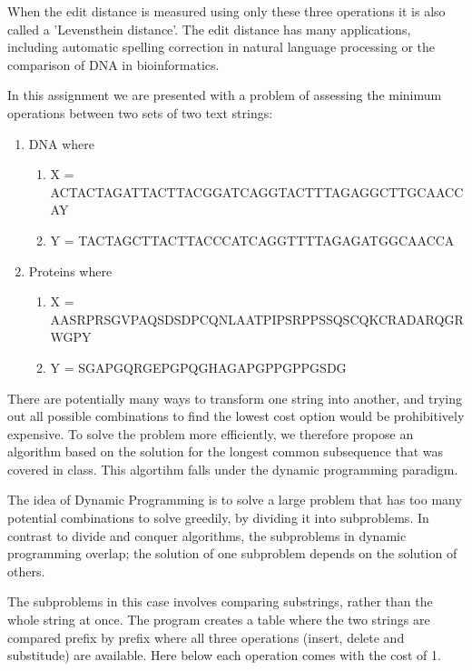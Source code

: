 \documentclass[11pt]{article}
\providecommand{\tightlist}{%
      \setlength{\itemsep}{0pt}\setlength{\parskip}{0pt}}
\begin{document}
When the edit distance is measured using only these three operations it
is also called a 'Levensthein distance'. The edit distance has many
applications, including automatic spelling correction in natural
language processing or the comparison of DNA in bioinformatics.

In this assignment we are presented with a problem of assessing the
minimum operations between two sets of two text strings:

\begin{enumerate}
\def\labelenumi{\arabic{enumi}.}
\tightlist
\item
  DNA where

  \begin{enumerate}
  \def\labelenumii{\alph{enumii})}
  \tightlist
  \item
    X = ACTACTAGATTACTTACGGATCAGGTACTTTAGAGGCTTGCAACCAY
  \item
    Y = TACTAGCTTACTTACCCATCAGGTTTTAGAGATGGCAACCA
  \end{enumerate}
\item
  Proteins where

  \begin{enumerate}
  \def\labelenumii{\alph{enumii})}
  \tightlist
  \item
    X = AASRPRSGVPAQSDSDPCQNLAATPIPSRPPSSQSCQKCRADARQGRWGPY
  \item
    Y = SGAPGQRGEPGPQGHAGAPGPPGPPGSDG
  \end{enumerate}
\end{enumerate}

There are potentially many ways to transform one string into another,
and trying out all possible combinations to find the lowest cost option
would be prohibitively expensive. To solve the problem more efficiently,
we therefore propose an algorithm based on the solution for the longest
common subsequence that was covered in class. This algortihm falls under
the dynamic programming paradigm.

The idea of Dynamic Programming is to solve a large problem that has too
many potential combinations to solve greedily, by dividing it into
subproblems. In contrast to divide and conquer algorithms, the
subproblems in dynamic programming overlap; the solution of one
subproblem depends on the solution of others.

The subproblems in this case involves comparing substrings, rather than
the whole string at once. The program creates a table where the two
strings are compared prefix by prefix where all three operations
(insert, delete and substitude) are available. Here below each operation
comes with the cost of 1.
\end{document}
